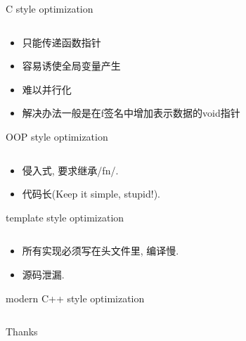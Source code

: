 \documentclass[compress]{beamer}
\begin{document}
\begin{frame}{C style optimization}
    \inputminted[fontsize=\footnotesize]{cpp}{optimize.h}
    \vskip5mm
    \pause
    \begin{itemize}[<+->]
        \item 只能传递函数指针
        \item 容易诱使全局变量产生
        \item 难以并行化
        \item 解决办法一般是在f签名中增加表示数据的void指针
    \end{itemize}
\end{frame}

\begin{frame}{OOP style optimization}
    \inputminted[fontsize=\footnotesize]{cpp}{old_optimize.hpp}
    \vskip5mm
    \pause
    \begin{itemize}[<+->]
        \item 侵入式, 要求继承/fn/.
        \item 代码长(Keep it simple, stupid!).
    \end{itemize}
\end{frame}

\begin{frame}{template style optimization}
    \inputminted[fontsize=\footnotesize]{cpp}{template_optimize.hpp}
    \vskip5mm
    \pause
    \begin{itemize}[<+->]
        \item 所有实现必须写在头文件里, 编译慢.
        \item 源码泄漏.
    \end{itemize}
\end{frame}

\begin{frame}{modern C++ style optimization}
    \inputminted[fontsize=\footnotesize]{cpp}{modern_optimize.hpp}
\end{frame}


\begin{frame}
    \begin{center}
        \huge{Thanks}
    \end{center}
\end{frame}
\end{document}
